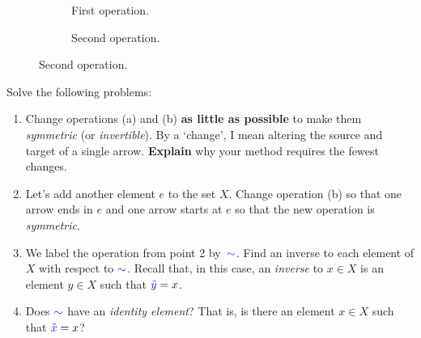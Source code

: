 \documentclass[a4paper,11pt]{article}
\newcommand{\clb}{\textcolor{blue}}
\begin{document}
\begin{figure}[ht]
 \centering
 \begin{subfigure}[b]{.48\textwidth}
  \centering
  \caption{First operation.}
 \end{subfigure}
 \begin{subfigure}[b]{.48\textwidth}
  \centering
  \caption{Second operation.}
 \end{subfigure}
\end{figure}

Solve the following problems:
\begin{enumerate}
 \item Change operations (a) and (b) \textbf{as little as possible} to make them
  \emph{symmetric} (or \emph{invertible}). By a `change', I mean altering the
  source and target of a single arrow. \textbf{Explain} why your method requires
  the fewest changes.
 \item Let's add another element $e$ to the set $X$. Change operation (b) so
  that one arrow ends in $e$ and one arrow starts at $e$ so that the new
  operation is \emph{symmetric}.
 \item We label the operation from point 2 by~$\clb{ \sim }$. Find an inverse to
  each element of $X$ with respect to $\clb{ \sim }$. Recall that, in this case,
  an \emph{inverse} to $x \in X$ is an element $y \in X$ such that
  $\clb{\tilde{y}} = x$.
 \item Does $\clb{ \sim }$ have an \emph{identity element}? That is, is there an
  element $x \in X$ such that $\clb{\tilde{x}} = x$?
\end{enumerate}
\end{document}
